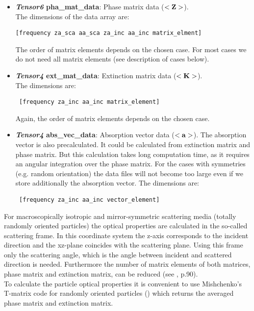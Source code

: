 \begin{itemize}
\item {\bf {\sl Tensor6} pha\_mat\_data}: Phase matrix data ($<{\bf Z}>$). \\
  The dimensions of the data array are:
 \hspace*{2ex}\begin{verbatim}[frequency za_sca aa_sca za_inc aa_inc matrix_elment]\end{verbatim} 
The order of matrix elements depends on
the chosen case.  For most cases we do not need all matrix
elements (see description of cases below).

\item {\bf {\sl Tensor4} ext\_mat\_data}: Extinction matrix data ($<{\bf K}>$). \\
  The dimensions are:
 \hspace*{2ex}\begin{verbatim} [frequency za_inc aa_inc matrix_element] \end{verbatim}
Again, the order of matrix elements depends on the chosen case.

\item {\bf {\sl Tensor4} abs\_vec\_data}: Absorption vector data ($<{\bf
    a}>$).  The absorption vector is also precalculated. It could be calculated from extinction matrix and phase matrix. But this calculation takes long
  computation time, as it requires an angular integration over
  the phase matrix.  For the cases with symmetries (e.g. random
  orientation) the data files will not become too large even if we
  store additionally the absorption vector. The dimensions are:
  \hspace*{2ex}\begin{verbatim} [frequency za_inc aa_inc vector_element] \end{verbatim}

\end{itemize}


\label{sec:scattering:rand_orientation}

  For macroscopically isotropic and mirror-symmetric scattering media
  (totally randomly oriented particles) the optical properties are calculated in the so-called scattering frame.
 In this coordinate
  system the z-axis corresponds to the incident direction and the
  xz-plane coincides with the scattering plane. Using this frame only the scattering angle, which is the angle between incident and scattered direction is needed. Furthermore the number of matrix elements of both matrices, phase matrix and extinction matrix, can be reduced (see \cite{Mishchenko:02}, p.90).\\
To calculate the particle optical properties it is convenient to use Mishchenko's T-matrix code for randomly oriented particles (\cite{Mishchenko:98}) which returns the averaged phase matrix and extinction matrix. 

